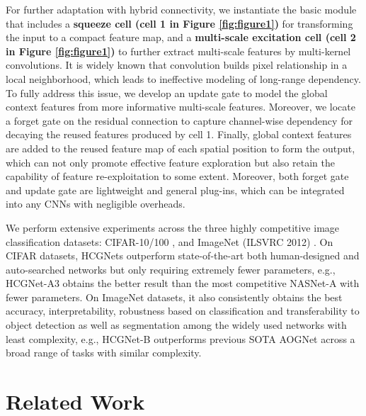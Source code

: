 \documentclass[letterpaper]{article}
\begin{document}
 For further adaptation with hybrid connectivity, we instantiate the basic module that includes a \textbf{squeeze cell (cell 1 in Figure \ref{fig:figure1})} for transforming the input to a compact feature map, and a \textbf{multi-scale excitation cell (cell 2 in Figure \ref{fig:figure1})} to further extract multi-scale features by multi-kernel convolutions. It is widely known that convolution builds pixel relationship in a local neighborhood, which leads to ineffective modeling of long-range dependency. To fully address this issue, we develop an update gate to model the global context features from more informative multi-scale features. Moreover, we locate a forget gate on the residual connection to capture channel-wise dependency for decaying the reused features produced by cell 1. Finally, global context features are added to the reused feature map of each spatial position to form the output, which can not only promote effective feature exploration but also retain the capability of feature re-exploitation to some extent. Moreover, both forget gate and update gate are lightweight and general plug-ins, which can be integrated into any CNNs with negligible overheads.
 
 We perform extensive experiments across the three highly competitive image classification datasets: CIFAR-10/100 \cite{krizhevsky2009learning}, and ImageNet (ILSVRC 2012) \cite{deng2009imagenet}. On CIFAR datasets, HCGNets outperform state-of-the-art both human-designed and auto-searched networks but only requiring extremely fewer parameters, e.g., HCGNet-A3 obtains the better result than the most competitive NASNet-A \cite{zoph2018learning} with  fewer parameters. On ImageNet datasets, it also consistently obtains the best accuracy, interpretability, robustness based on classification and transferability to object detection as well as segmentation among the widely used networks with least complexity, e.g., HCGNet-B outperforms previous SOTA AOGNet across a broad range of tasks with similar complexity. 
 	
 	
 	\section{Related Work}
 	
\end{document}
